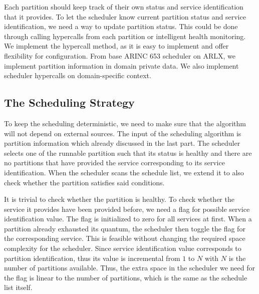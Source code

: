 \documentclass[conference]{IEEEtran}
\begin{document}
Each partition should keep track of their own status and service identification that it
provides. To let the scheduler know current partition status and service identification, we need
a way to update partition status. This could be done through calling hypercalls from each
partition or intelligent health monitoring. We implement the hypercall method, as it is easy to
implement and offer flexibility for configuration. From base ARINC 653 scheduler on ARLX, we
implement partition information in domain private data. We also implement scheduler hypercalls
on domain-specific context.

\subsection{The Scheduling Strategy}

To keep the scheduling deterministic, we need to make sure that the algorithm will not depend on
external sources. The input of the scheduling algorithm is partition information which already
discussed in the last part. The scheduler selects one of the runnable partition such that its
status is healthy and there are no partitions that have provided the service corresponding to
its service identification. When the scheduler scans the schedule list, we extend it to also
check whether the partition satisfies said conditions.

It is trivial to check whether the partition is healthy. To check whether the service it
provides have been provided before, we need a flag for possible service identification value.
The flag is initialized to zero for all services at first. When a partition already exhausted
its quantum, the scheduler then toggle the flag for the corresponding service. This is feasible
without changing the required space complexity for the scheduler. Since service identification
value corresponds to partition identification, thus its value is incremental from $1$ to $N$
with $N$ is the number of partitions available. Thus, the extra space in the scheduler we need
for the flag is linear to the number of partitions, which is the same as the schedule list
itself.
\end{document}
